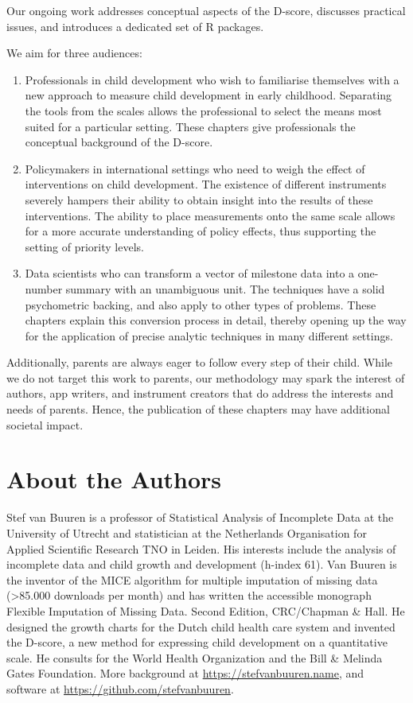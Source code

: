 \documentclass[
]{book}
\begin{document}
Our ongoing work addresses conceptual aspects of the D-score, discusses practical issues, and introduces a dedicated set of R packages.

We aim for three audiences:

\begin{enumerate}
\def\labelenumi{\arabic{enumi}.}
\item
  Professionals in child development who wish to familiarise themselves with a new approach to measure child development in early childhood. Separating the tools from the scales allows the professional to select the means most suited for a particular setting. These chapters give professionals the conceptual background of the D-score.
\item
  Policymakers in international settings who need to weigh the effect of interventions on child development. The existence of different instruments severely hampers their ability to obtain insight into the results of these interventions. The ability to place measurements onto the same scale allows for a more accurate understanding of policy effects, thus supporting the setting of priority levels.
\item
  Data scientists who can transform a vector of milestone data into a one-number summary with an unambiguous unit. The techniques have a solid psychometric backing, and also apply to other types of problems. These chapters explain this conversion process in detail, thereby opening up the way for the application of precise analytic techniques in many different settings.
\end{enumerate}

Additionally, parents are always eager to follow every step of their child. While we do not target this work to parents, our methodology may spark the interest of authors, app writers, and instrument creators that do address the interests and needs of parents. Hence, the publication of these chapters may have additional societal impact.

\hypertarget{about-the-authors}{%
\section*{About the Authors}\label{about-the-authors}}

Stef van Buuren is a professor of Statistical Analysis of Incomplete Data at the University of Utrecht and statistician at the Netherlands Organisation for Applied Scientific Research TNO in Leiden. His interests include the analysis of incomplete data and child growth and development (h-index 61). Van Buuren is the inventor of the MICE algorithm for multiple imputation of missing data (\textgreater85.000 downloads per month) and has written the accessible monograph Flexible Imputation of Missing Data. Second Edition, CRC/Chapman \& Hall. He designed the growth charts for the Dutch child health care system and invented the D-score, a new method for expressing child development on a quantitative scale. He consults for the World Health Organization and the Bill \& Melinda Gates Foundation. More background at \url{https://stefvanbuuren.name}, and software at \url{https://github.com/stefvanbuuren}.
\end{document}

